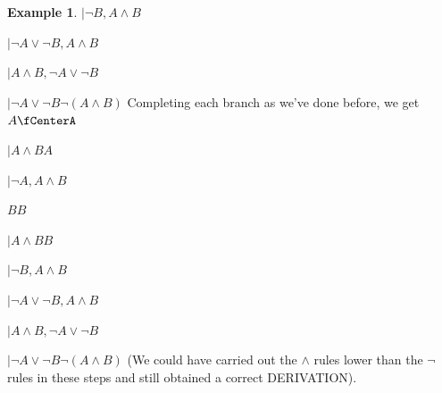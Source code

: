 \documentclass[10pt,a4paper]{article}
\newcommand*{\olup}[1]{\MakeUppercase{#1}}
\theoremstyle{plain}
\theoremstyle{definition}
\newtheorem{ex}[thm]{Example}
\theoremstyle{remark}
\providecommand{\AxiomC}[1]{}
\providecommand{\RightLabel}[1]{}
\providecommand{\fCenter}{}
\newenvironment{prooftree}{}{}
\providecommand{\LeftR}[1]{}
\providecommand{\RightR}[1]{}
\providecommand{\UnaryInf}{\ensuremath{\mid}}
\providecommand{\BinaryInf}{\ensuremath{\mid}}
\providecommand{\RightR}{\mathrm{R}}
\providecommand{\LeftR}{\mathrm{L}}
\providecommand{\Axiom}{\mathrm{Ax}}
\begin{document}
\begin{ex}
\begin{prooftree}
\AxiomC{}
\UnaryInf$\lnot B, A \land B \fCenter $

\RightLabel{\LeftR{\lor}}
\BinaryInf$\lnot A \lor \lnot B, A \land B \fCenter $
\RightLabel{\LeftR{\Exchange}}
\UnaryInf$A \land B, \lnot A \lor \lnot B \fCenter $
\RightLabel{\RightR{\lnot}}
\UnaryInf$\lnot A \lor \lnot B \fCenter \lnot (A \land B)$
\end{prooftree}
Completing each branch as we've done before, we get
\begin{prooftree}
\Axiom$ A \fCenterA$
\RightLabel{\LeftR{\land}}
\UnaryInf$A \land B \fCenter A$
\RightLabel{\LeftR{\lnot}}
\UnaryInf$\lnot A, A \land B \fCenter $

\Axiom$ B \fCenter B$
\RightLabel{\LeftR{\land}}
\UnaryInf$A \land B \fCenter B$
\RightLabel{\LeftR{\lnot}}
\UnaryInf$\lnot B, A \land B \fCenter $

\RightLabel{\LeftR{\lor}}
\BinaryInf$\lnot A \lor \lnot B, A \land B \fCenter $
\RightLabel{\LeftR{\Exchange}}
\UnaryInf$A \land B, \lnot A \lor \lnot B \fCenter $
\RightLabel{\RightR{\lnot}}
\UnaryInf$\lnot A \lor \lnot B \fCenter \lnot (A \land B)$
\end{prooftree}
(We could have carried out the $\land$ rules lower than the $\lnot$
rules in these steps and still obtained a correct \olup{derivation}).
\end{ex}
\end{document}

